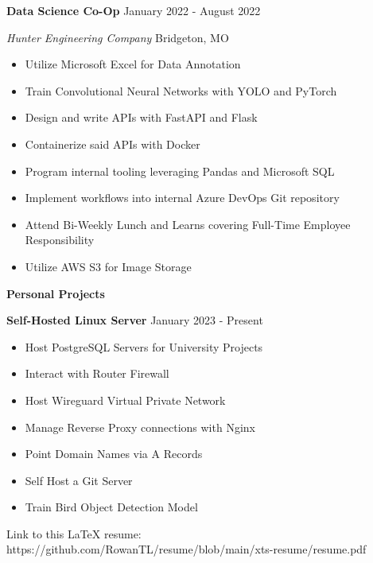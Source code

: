 \documentclass[11pt]{article}
\begin{document}
\textbf{Data Science Co-Op} \hfill January 2022 - August 2022

\textsl{Hunter Engineering Company} \hfill Bridgeton, MO
\begin{itemize}[noitemsep]
    \item Utilize Microsoft Excel for Data Annotation
    \item Train Convolutional Neural Networks with YOLO and PyTorch
    \item Design and write APIs with FastAPI and Flask
    \item Containerize said APIs with Docker
    \item Program internal tooling leveraging Pandas and Microsoft SQL
    \item Implement workflows into internal Azure DevOps Git repository
    \item Attend Bi-Weekly Lunch and Learns covering Full-Time Employee Responsibility
    \item Utilize AWS S3 for Image Storage
\end{itemize}

\begin{center}
    \textbf{Personal Projects}
\end{center}

\textbf{Self-Hosted Linux Server} \hfill January 2023 - Present
\begin{itemize}[noitemsep]
    \item Host PostgreSQL Servers for University Projects
    \item Interact with Router Firewall
    \item Host Wireguard Virtual Private Network
    \item Manage Reverse Proxy connections with Nginx
    \item Point Domain Names via A Records
    \item Self Host a Git Server
    \item Train Bird Object Detection Model
\end{itemize}

\begin{center}
    \tiny{Link to this LaTeX resume: https://github.com/RowanTL/resume/blob/main/xts-resume/resume.pdf}
\end{center}
\end{document}
